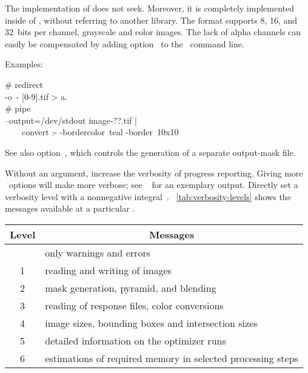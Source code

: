 \begin{codelist}
\begin{geeknote}
    The  implementation of
     does not seek.  Moreover, it is completely
    implemented inside of , without referring to another library.  The format
    supports 8, 16, and 32~bits per channel, grayscale and color images.  The lack of alpha
    channels can easily be compensated by adding
    option~ to the \appcmd{}~command line.
  \end{geeknote}

  Examples:
  \begin{literal}
    \# redirect \\
    \app{} -o~- [0-9].tif > a. \\
    \# pipe \\
    \app{} --output=/dev/stdout image-??.tif | \bslash \\
    ~~~~convert :-
    -bordercolor~teal -border~10x10
  \end{literal}

  See also option~, which controls the
  generation of a separate output-mask file.


  \label{opt:verbose}%
\item[\itempar{-v \optional{\metavar{LEVEL}} \\ --verbose\optional{=\metavar{LEVEL}}}]\itemend
  Without an argument, increase the verbosity of progress reporting.  Giving more
  ~options will make \App{} more verbose; see
  \sectionName~ for an exemplary output.  Directly set a
  verbosity level with a nonnegative integral~.
  \tableName~\ref{tab:verbosity-levels} shows the messages available at a particular
  .

  \begin{table}
    \centering
    \begin{tabular}{cp{.75\linewidth}}
      \hline
      \multicolumn{1}{c|}{Level} & \multicolumn{1}{c}{Messages} \\
      \hline\extraheadingsep
      0 & only warnings and errors \\
      1 & reading and writing of images \\
      2 & mask generation, pyramid, and blending \\
      3 & reading of response files, color conversions \\
      4 & image sizes, bounding boxes and intersection sizes \\
      5 & \restrictednote{\application{Enblend} only.} detailed
      information on the optimizer runs \\
      6 & estimations of required memory in selected processing steps \\
    \end{tabular}


\end{table}
\end{codelist}
